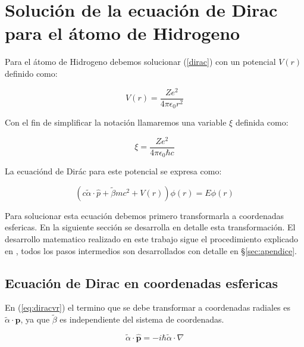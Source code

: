 \documentclass[a4paper, 12pt]{article} %
\begin{document}

\section{Soluci\'on de la ecuaci\'on de Dirac para el \'atomo de Hidrogeno}


Para el \'atomo de Hidrogeno debemos solucionar (\ref{dirac})
con un potencial $V(r)$ definido como:

\begin{equation}
V(r) = \dfrac{Ze^2}{4\pi\epsilon_0 r^2}
\end{equation}

Con el fin de simplificar la notaci\'on llamaremos una variable
$\xi$ definida como:

\begin{equation}
\xi = \dfrac{Ze^2}{4\pi \epsilon_0 \hbar c}
\end{equation}

La ecuaci\'ond de Dir\'ac para este potencial se expresa como:

\begin{equation}\label{eq:diracvr}
(c \widetilde{\alpha} \cdot \hat{p} + \widetilde{\beta} m c^2 + V(r) ) \phi(r) = E \phi (r)
\end{equation}

Para solucionar esta ecuaci\'on debemos primero transformarla a coordenadas
esfericas. En la siguiente secci\'on se desarrolla en detalle esta transformaci\'on.
El desarrollo matematico realizado en este trabajo sigue el procedimiento 
explicado en \cite{strange}, todos los pasos intermedios son desarrollados con 
detalle en \S \ref{sec:apendice}. 
\subsection{Ecuaci\'on de Dirac en coordenadas esfericas}

En (\ref{eq:diracvr}) el termino que se debe transformar a coordenadas radiales
 es $\widetilde{\alpha} \cdot \hat{\mathbf{p}}$, ya que $\widetilde{\beta}$ es independiente del sistema de coordenadas. 

\begin{equation}\label{eq:alphap}
\widetilde{\alpha} \cdot \hat{\mathbf{p}} = -i \hbar \widetilde{\alpha} \cdot \nabla
\end{equation}
\end{document}
